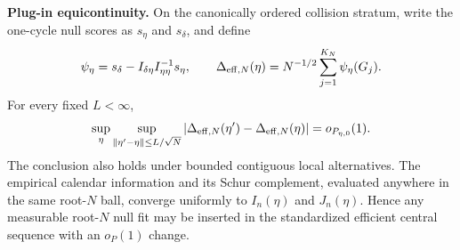 \smallskip\noindent\textbf{Plug-in equicontinuity.}
On the canonically ordered collision stratum, write the one-cycle null scores
as \(s_\eta\) and \(s_\delta\), and define
\[
 \psi_\eta=s_\delta-I_{\delta\eta}I_{\eta\eta}^{-1}s_\eta,
 \qquad
 \Delta_{{\rm eff},N}(\eta)=N^{-1/2}
 \sum_{j=1}^{K_N}\psi_\eta(G_j).
\]
For every fixed \(L<\infty\),
\[
 \sup_\eta\sup_{\|\eta'-\eta\|\le L/\sqrt N}
 |\Delta_{{\rm eff},N}(\eta')-\Delta_{{\rm eff},N}(\eta)|
 =o_{P_{\eta,0}}(1).
\]
The conclusion also holds under bounded contiguous local alternatives.  The
empirical calendar information and its Schur complement, evaluated anywhere
in the same root-\(N\) ball, converge uniformly to \(I_n(\eta)\) and
\(J_n(\eta)\).  Hence any measurable root-\(N\) null fit may be inserted in
the standardized efficient central sequence with an \(o_P(1)\) change.

